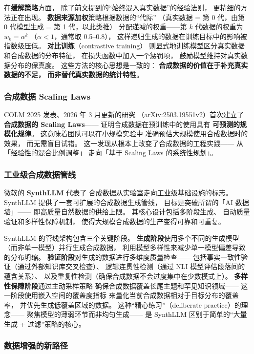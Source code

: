 在\textbf{缓解策略}方面，
除了前文提到的``始终混入真实数据''的经验法则，
更精细的方法正在出现。
\textbf{数据来源加权}策略根据数据的``代际''
（真实数据 = 第 0 代，由第 0 代模型生成 = 第 1 代，以此类推）
分配递减的权重——第 $k$ 代数据的权重为 $w_k = \alpha^k$
（$\alpha < 1$，通常取 0.5--0.8），
这样递归生成的数据在训练目标中的影响被指数级压低。
\textbf{对比训练}（contrastive training）
则显式地训练模型区分真实数据和合成数据的分布特征，
在损失函数中加入一个惩罚项，
鼓励模型维持对真实数据分布的保真度。
这些方法的核心思想是一致的：
\textbf{合成数据的价值在于补充真实数据的不足，
而非替代真实数据的统计特性}。

\subsubsection{合成数据 Scaling Laws}

COLM 2025 发表、2026 年 3 月更新的研究
（arXiv:2503.19551v2）首次建立了
\textbf{合成数据的 Scaling Laws}——
证明合成数据在预训练中的使用具有
\textbf{可预测的规模化规律}。
这意味着团队可以在小规模实验中
准确预估大规模使用合成数据时的效果，
而无需盲目试错。
这一发现从根本上改变了合成数据的工程实践——
从「经验性的混合比例调整」
走向「基于 Scaling Laws 的系统性规划」。

\subsubsection{工业级合成数据管线}

微软的 \textbf{SynthLLM} 代表了
合成数据从实验室走向工业级基础设施的标志。
SynthLLM 提供了一套可扩展的合成数据生成管线，
目标是突破所谓的「AI 数据墙」——
即高质量自然数据的供给上限。
其核心设计包括多阶段生成、
自动质量验证和多样性保障机制，
使得大规模合成数据的生产变得可靠和可重复。

SynthLLM 的管线架构包含三个关键阶段。
\textbf{生成阶段}使用多个不同的生成模型
（而非单一模型）并行生成合成数据，
利用模型多样性来减少单一模型偏差导致的分布坍缩。
\textbf{验证阶段}对生成的数据进行多维度质量检查——
包括事实一致性验证（通过外部知识库交叉检查）、
逻辑连贯性检测（通过 NLI 模型评估段落间的蕴含关系）、
以及重复性检测（确保合成数据不会过度集中在少数模式上）。
\textbf{多样性保障阶段}通过主动采样策略
确保合成数据覆盖长尾主题和罕见知识领域——
这一阶段使用嵌入空间的覆盖度指标
来量化当前合成数据相对于目标分布的覆盖率，
并优先生成低覆盖区域的数据。
这种``精心练习''（deliberate practice）的理念——
聚焦模型的薄弱环节而非均匀生成——
是 SynthLLM 区别于简单的``大量生成 + 过滤''策略的核心。

\subsubsection{数据增强的新路径}


